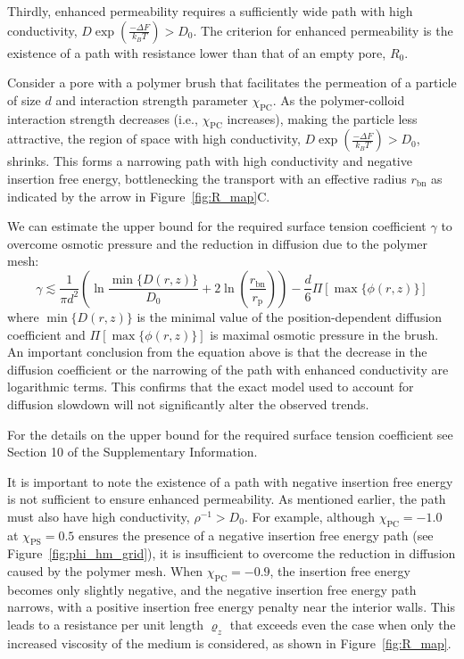 \documentclass[12pt, a4paper]{article}
\begin{document}
Thirdly, enhanced permeability requires a sufficiently wide path with high conductivity, $D\exp\left(\frac{-\Delta F}{k_B T}\right) > D_0$.
The criterion for enhanced permeability is the existence of a path with resistance lower than that of an empty pore, $R_{0}$.

Consider a pore with a polymer brush that facilitates the permeation of a particle of size $d$ and interaction strength parameter $\chi_{\text{PC}}$.
As the polymer-colloid interaction strength decreases (i.e., $\chi_{\text{PC}}$ increases), making the particle less attractive, the region of space with high conductivity, $D\exp\left(\frac{-\Delta F}{k_B T}\right) > D_0$, shrinks.
This forms a narrowing path with high conductivity and negative insertion free energy, bottlenecking the transport with an effective radius $r_{\text{bn}}$ as indicated by the arrow in Figure~\ref{fig:R_map}C.

We can estimate the upper bound for the required surface tension coefficient $\gamma$ to overcome osmotic pressure and the reduction in diffusion due to the polymer mesh:
\begin{equation}
    \label{eq:gamma_crit}
    \gamma \lesssim \frac{1}{\pi d^2} \left( \ln\frac{\min\{D(r,z)\}}{D_0} + 2\ln\left( \frac{r_{\text{bn}}}{r_{\text{p}}} \right) \right) - \frac{d}{6}\Pi\left[\max\{\phi(r,z)\}\right]
\end{equation}
where $\min\{D(r,z)\}$ is the minimal value of the position-dependent diffusion coefficient and $\Pi\left[\max\{\phi(r,z)\}\right]$ is maximal osmotic pressure in the brush.
An important conclusion from the equation above is that the decrease in the diffusion coefficient or the narrowing of the path with enhanced conductivity are logarithmic terms.
This confirms that the exact model used to account for diffusion slowdown will not significantly alter the observed trends.

For the details on the upper bound for the required surface tension coefficient see
Section 10 of the Supplementary Information.

It is important to note the existence of a path with negative insertion free energy is not sufficient to ensure enhanced permeability.
As mentioned earlier, the path must also have high conductivity, $\rho^{-1} > D_0$.
For example, although $\chi_{\text{PC}} = -1.0$ at $\chi_{\text{PS}} = 0.5$ ensures the presence of a negative insertion free energy path (see Figure~\ref{fig:phi_hm_grid}), it is insufficient to overcome the reduction in diffusion caused by the polymer mesh.
When $\chi_{\text{PC}} = -0.9$, the insertion free energy becomes only slightly negative, and the negative insertion free energy path narrows, with a positive insertion free energy penalty near the interior walls. 
This leads to a resistance per unit length $\varrho_{z}$ that exceeds even the case when only the increased viscosity of the medium is considered, as shown in Figure~\ref{fig:R_map}.
\end{document}
